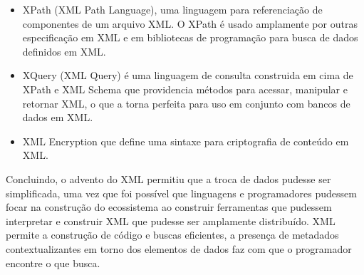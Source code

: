 \begin{itemize}
  \item XPath (XML Path Language), uma linguagem para referenciação de componentes de um arquivo XML. O XPath é usado amplamente por outras especificação em XML e em bibliotecas de programação para busca de dados definidos em XML.
  \item XQuery (XML Query) é uma linguagem de consulta construida em cima de XPath e XML Schema que providencia métodos para acessar, manipular e retornar XML, o que a torna perfeita para uso em conjunto com bancos de dados em XML.
  \item XML Encryption que define uma sintaxe para criptografia de conteúdo em XML.
\end{itemize}

Concluindo, o advento do XML permitiu que a troca de dados pudesse ser simplificada, uma vez que foi possível que linguagens e programadores pudessem focar na construção do ecossistema ao construir ferramentas que pudessem interpretar e construir XML que pudesse ser amplamente distribuído. XML permite a construção de código e buscas eficientes, a presença de metadados contextualizantes em torno dos elementos de dados faz com que o programador encontre o que busca\cite{ibmxml}.

